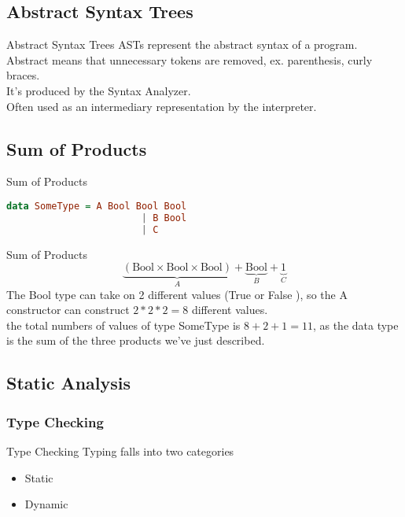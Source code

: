 \subsection{Abstract Syntax Trees}
\begin{frame}{Abstract Syntax Trees}
    ASTs represent the abstract syntax of a program.
    Abstract means that unnecessary tokens are removed, ex. parenthesis, curly braces.\\
    It's produced by the Syntax Analyzer.\\
    Often used as an intermediary representation by the interpreter.
\end{frame}

\subsection*{Sum of Products}
\begin{frame}[fragile]{Sum of Products}
    \begin{lstlisting}[language=Haskell]
        data SomeType = A Bool Bool Bool
                        | B Bool
                        | C
    \end{lstlisting}
\end{frame}

\begin{frame}{Sum of Products}
    \begin{equation*}
        \underbrace{(\text{Bool} \times \text{Bool} \times \text{Bool})}_{A} + \underbrace{\text{Bool}}_{B} + \underbrace{1}_{C}
    \end{equation*}
    The Bool type can take on 2 different values (True or False ), so the A constructor can construct $2 * 2 * 2 = 8$ different values.\\
    the total numbers of values of type SomeType is $8 + 2 + 1 = 11$, as the data type is the sum of the three products we've just described.
\end{frame}

\subsection{Static Analysis}
\subsubsection*{Type Checking}
\begin{frame}{Type Checking}
    Typing falls into two categories
    \begin{itemize}[<+->]
        \item Static
        \item Dynamic
    \end{itemize}
\end{frame}

